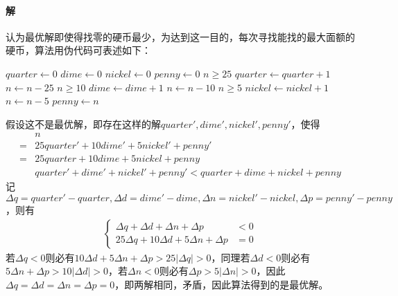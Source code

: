 \documentclass{article}
\begin{document}
\paragraph{解}
认为最优解即使得找零的硬币最少，为达到这一目的，每次寻找能找的最大面额的硬币，算法用伪代码可表述如下：
\begin{codebox}
	\li $quarter \gets 0$
	\li $dime \gets 0$
	\li $nickel \gets 0$
	\li $penny \gets 0$
	\li \While $n \geq 25$
		\Do
	\li		$quarter \gets quarter + 1$
	\li		$n \gets n - 25$
		\End
	\li \While $n \geq 10$
		\Do
	\li		$dime \gets dime + 1$
	\li		$n \gets n - 10$
		\End
	\li \While $n \geq 5$
		\Do
	\li		$nickel \gets nickel + 1$
	\li		$n \gets n - 5$
		\End
	\li $penny \gets n$
\end{codebox}
假设这不是最优解，即存在这样的解${quarter',dime',nickel',penny'}$，使得
\begin{align*}
	& n \\
	=& 25quarter' + 10dime' + 5nickel' + penny' \\
	=& 25quarter + 10dime + 5nickel + penny \\
	&quarter' + dime' + nickel' + penny' < quarter + dime + nickel + penny
\end{align*}
记$\Delta q = quarter' - quarter,\Delta d = dime' - dime,\Delta n = nickel' - nickel,\Delta p = penny' - penny$，则有
\begin{align*}
	\left\{
	\begin{aligned}
		\Delta q + \Delta d + \Delta n + \Delta p &< 0 \\
		25\Delta q + 10\Delta d + 5\Delta n + \Delta p &= 0
	\end{aligned}
	\right.
\end{align*}
若$\Delta q < 0$则必有$10\Delta d + 5\Delta n + \Delta p > 25|\Delta q| > 0$，同理若$\Delta d < 0$则必有$5\Delta n + \Delta p > 10|\Delta d| > 0$，若$\Delta n < 0$则必有$\Delta p > 5|\Delta n| > 0$，因此$\Delta q = \Delta d = \Delta n = \Delta p = 0$，即两解相同，矛盾，因此算法得到的是最优解。
\end{document}
